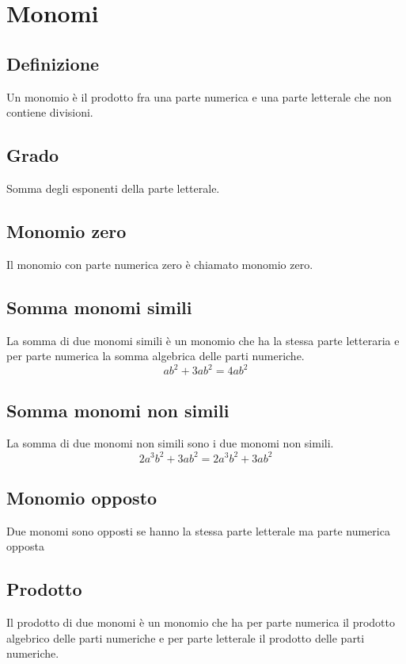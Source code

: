 \chapter{Monomi}
\section{Definizione}
Un monomio è il prodotto fra una parte numerica e una parte letterale che non contiene divisioni.
\section{Grado} 
Somma degli esponenti della parte letterale.
\section{Monomio zero}
Il monomio con parte numerica zero è chiamato monomio zero.
\section{Somma monomi simili}
La somma di due monomi simili è un monomio che ha la stessa parte letteraria e per parte numerica la somma algebrica delle parti numeriche.
\begin{equation*}
ab^2+3ab^2=4ab^2
\end{equation*}
\section{Somma monomi non simili}
La somma di due monomi non simili  sono i due monomi non simili.
\begin{equation*}
2a^3b^2+3ab^2=2a^3b^2+3ab^2
\end{equation*}
\section{Monomio opposto}
Due monomi sono opposti se hanno la stessa parte letterale ma parte numerica opposta
\section{Prodotto}
Il prodotto di due monomi è un monomio che ha per parte numerica il prodotto algebrico delle parti numeriche e per parte letterale il prodotto delle parti numeriche.